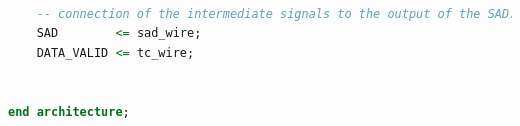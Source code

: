 \documentclass[12pt, a4paper]{article}
\begin{document}
\begin{appendices}
\begin{lstlisting}[language=vhdl]
	
	-- connection of the intermediate signals to the output of the SAD.
	SAD        <= sad_wire;
	DATA_VALID <= tc_wire;


end architecture;


\end{lstlisting}






\end{appendices}
\end{document}
